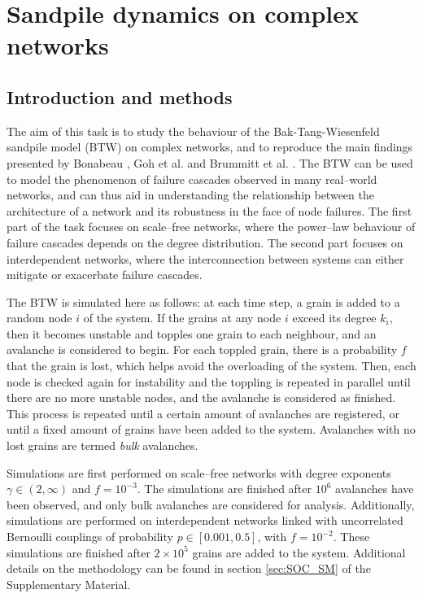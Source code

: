 \chapter{Sandpile dynamics on complex networks}


\section{Introduction and methods}
 
The aim of this task is to study the behaviour of the Bak-Tang-Wiesenfeld sandpile model (BTW) \cite{bak1987self} on complex networks, and to reproduce the main findings presented by Bonabeau \cite{bonabeau1995sandpile}, Goh et al. \cite{goh2003sandpile} and Brummitt et al. \cite{brummitt2012suppressing}. The BTW can be used to model the phenomenon of failure cascades observed in many real--world networks, and can thus aid in understanding the relationship between the architecture of a network and its robustness in the face of node failures. The first part of the task focuses on scale--free networks, where the power--law behaviour of failure cascades depends on the degree distribution. The second part focuses on interdependent networks, where the interconnection between systems can either mitigate or exacerbate failure cascades. 

The BTW is simulated here as follows: at each time step, a grain is added to a random node $i$ of the system. If the grains at any node $i$ exceed its degree $k_i$, then it becomes unstable and topples one grain to each neighbour, and an avalanche is considered to begin. For each toppled grain, there is a probability $f$ that the grain is lost, which helps avoid the overloading of the system. Then, each node is checked again for instability and the toppling is repeated in parallel until there are no more unstable nodes, and the avalanche is considered as finished. This process is repeated until a certain amount of avalanches are registered, or until a fixed amount of grains have been added to the system. Avalanches with no lost grains are termed \textit{bulk} avalanches.

Simulations are first performed on scale--free networks with degree exponents $\gamma\in(2,\infty)$ and $f=10^{-3}$. The simulations are finished after $10^6$ avalanches have been observed, and only bulk avalanches are considered for analysis. Additionally, simulations are performed on interdependent networks linked with uncorrelated Bernoulli couplings of probability $p\in[0.001, 0.5]$, with $f=10^{-2}$. These simulations are finished after $2\times10^5$ grains are added to the system. Additional details on the methodology can be found in section \ref{sec:SOC_SM} of the Supplementary Material.


